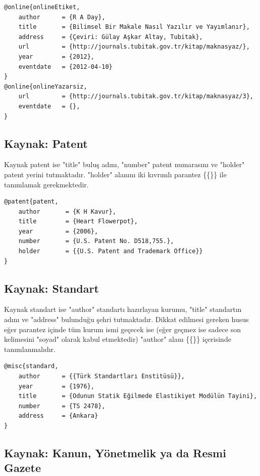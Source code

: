 \begin{lstlisting}[language={[LaTeX]{TeX}}, label=bib:web, caption=Kaynak web sayfası ise]
@online{onlineEtiket,
	author		= {R A Day},
	title		= {Bilimsel Bir Makale Nasıl Yazılır ve Yayımlanır},
	address 	= {Çeviri: Gülay Aşkar Altay, Tubitak},
	url			= {http://journals.tubitak.gov.tr/kitap/maknasyaz/},
	year		= {2012},
	eventdate	= {2012-04-10}
}
@online{onlineYazarsiz,
	url			= {http://journals.tubitak.gov.tr/kitap/maknasyaz/3},
	eventdate	= {},
}
\end{lstlisting}

\subsection{Kaynak: Patent}

Kaynak patent ise "title" buluş adını, "number" patent numarasını ve "holder" patent yerini tutmaktadır. "holder" alanını iki kıvrımlı parantez \{\{\}\} ile tanımlamak gerekmektedir. 

\begin{lstlisting}[language={[LaTeX]{TeX}}, label=bib:patent, caption=Kaynak patent ise]
@patent{patent,
	author       = {K H Kavur},
	title        = {Heart Flowerpot},
	year		 = {2006},
	number       = {U.S. Patent No. D518,755.},
	holder       = {{U.S. Patent and Trademark Office}}	
}
\end{lstlisting}

\subsection{Kaynak: Standart}

Kaynak standart ise "author" standartı hazırlayan kurumu, "title" standartın adını ve "address" bulunduğu şehri tutmaktadır. Dikkat edilmesi gereken husus eğer parantez içinde tüm kurum ismi geçecek ise (eğer geçmez ise sadece son kelimesini "soyad" olarak kabul etmektedir) "author" alanı \{\{\}\} içerisinde tanımlanmalıdır.

\begin{lstlisting}[language={[LaTeX]{TeX}}, label=bib:standart, caption=Kaynak standart ise]
@misc{standard,
	author		= {{Türk Standartları Enstitüsü}},
	year		= {1976},
	title		= {Odunun Statik Eğilmede Elastikiyet Modülün Tayini},
	number 		= {TS 2478},
	address     = {Ankara}
}
\end{lstlisting}

\subsection{Kaynak: Kanun, Yönetmelik ya da Resmi Gazete}

